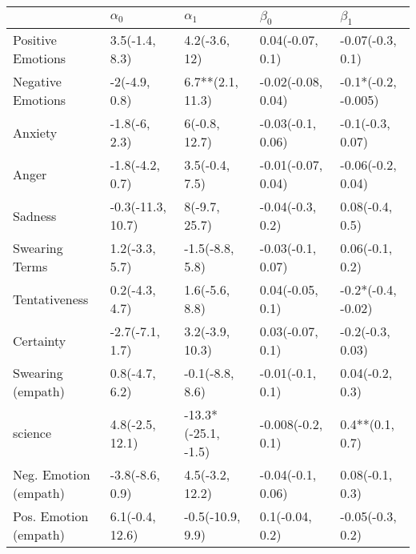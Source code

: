 \begin{tabular}{lllll}
\toprule
{} &         $\alpha_0$ &           $\alpha_1$ &           $\beta_0$ &            $\beta_1$ \\
\midrule
Positive Emotions     &     3.5(-1.4, 8.3) &        4.2(-3.6, 12) &    0.04(-0.07, 0.1) &     -0.07(-0.3, 0.1) \\
Negative Emotions     &      -2(-4.9, 0.8) &     6.7**(2.1, 11.3) &  -0.02(-0.08, 0.04) &  -0.1*(-0.2, -0.005) \\
Anxiety               &      -1.8(-6, 2.3) &        6(-0.8, 12.7) &   -0.03(-0.1, 0.06) &     -0.1(-0.3, 0.07) \\
Anger                 &    -1.8(-4.2, 0.7) &       3.5(-0.4, 7.5) &  -0.01(-0.07, 0.04) &    -0.06(-0.2, 0.04) \\
Sadness               &  -0.3(-11.3, 10.7) &        8(-9.7, 25.7) &    -0.04(-0.3, 0.2) &      0.08(-0.4, 0.5) \\
Swearing Terms        &     1.2(-3.3, 5.7) &      -1.5(-8.8, 5.8) &   -0.03(-0.1, 0.07) &      0.06(-0.1, 0.2) \\
Tentativeness         &     0.2(-4.3, 4.7) &       1.6(-5.6, 8.8) &    0.04(-0.05, 0.1) &   -0.2*(-0.4, -0.02) \\
Certainty             &    -2.7(-7.1, 1.7) &      3.2(-3.9, 10.3) &    0.03(-0.07, 0.1) &     -0.2(-0.3, 0.03) \\
Swearing (empath)     &     0.8(-4.7, 6.2) &      -0.1(-8.8, 8.6) &    -0.01(-0.1, 0.1) &      0.04(-0.2, 0.3) \\
science               &    4.8(-2.5, 12.1) &  -13.3*(-25.1, -1.5) &   -0.008(-0.2, 0.1) &      0.4**(0.1, 0.7) \\
Neg. Emotion (empath) &    -3.8(-8.6, 0.9) &      4.5(-3.2, 12.2) &   -0.04(-0.1, 0.06) &      0.08(-0.1, 0.3) \\
Pos. Emotion (empath) &    6.1(-0.4, 12.6) &     -0.5(-10.9, 9.9) &     0.1(-0.04, 0.2) &     -0.05(-0.3, 0.2) \\
\bottomrule
\end{tabular}
